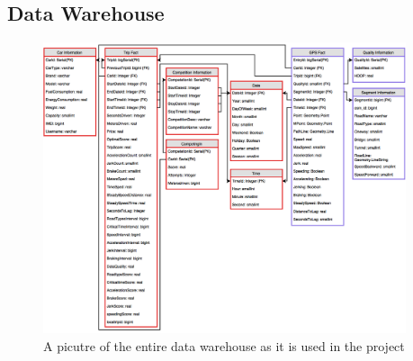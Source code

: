 \subsection*{Data Warehouse}\label{app:datawarehouse}

\begin{figure}[tb]
\centering
\includegraphics[width=0.95\textwidth]{Pictures/newdatawarehouse}
\caption{A picutre of the entire data warehouse as it is used in the project}
\label{app:fig:newdatawarehouse}
\end{figure}